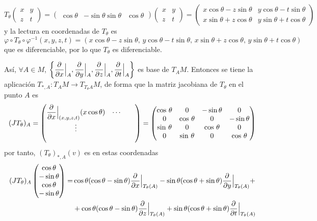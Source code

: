 \begin{sol}
    $$T_{\theta} \begin{pmatrix}
        x & y \\ z & t 
    \end{pmatrix} =  \begin{pmatrix}
        \cos  \theta  & -\sin \theta \sin\theta & \cos  \theta  
    \end{pmatrix} \begin{pmatrix}
        x & y \\ z & t 
    \end{pmatrix} =  \begin{pmatrix}
        x \cos  \theta-z \sin\theta & y \cos  \theta-t \sin\theta \\ x \sin\theta + z  \cos  \theta & y \sin\theta + t  \cos  \theta 
    \end{pmatrix} $$
    y la lectura en coordenadas de $T_{\theta}$ es $$\varphi \circ T_{\theta} \circ \varphi^{-1} (x,y,z,t) = (x \cos  \theta-z \sin\theta , \, y \cos  \theta-t \sin\theta,  \, x \sin\theta + z  \cos  \theta, \,  y \sin\theta + t  \cos  \theta )$$
    que es diferenciable, por lo que $T_{\theta}$ es diferenciable.

    As\'i, $\forall A \in M$, $\left\{\dfrac{\partial^{} }{\partial x} \Big|_A, \dfrac{\partial^{} }{\partial y} \Big|_A, \dfrac{\partial^{} }{\partial z} \Big|_A, \dfrac{\partial^{} }{\partial t} \Big|_A \right\}$ es base de $T_AM$. Entonces se tiene la aplicaci\'on $T_{*,A}: T_AM \longrightarrow T_{T_{\theta}A} M$, de forma que la matriz jacobiana de $T_{\theta}$ en el punto $A$ es 
    $$(JT_{\theta})_A = \begin{pmatrix}
        \dfrac{\partial^{} }{\partial x} \Big|_{(x,y,z,t)} (x  \cos  \theta ) &  \cdots & & \\
        \vdots \\ \\ 
    \end{pmatrix} = \begin{pmatrix}
         \cos  \,  \theta  & 0 & -\sin \theta & 0\\ 
        0 &  \cos  \, \theta & 0 & -\sin \theta \\
       \sin \, \theta & 0 &  \cos  \, \theta & 0 \\ 
        0 &\sin \, \theta & 0 &  \cos  \, \theta
    \end{pmatrix}$$
    por tanto, $(T_{\theta})_{*,A}(v)$ es en estas coordenadas
    \[\begin{split} (JT_{\theta})_A \begin{pmatrix}
         \cos  \theta \\ -\sin \theta \\  \cos  \theta \\ -\sin \theta  
    \end{pmatrix}= &   \cos  \theta ( \cos  \theta -\sin  \theta ) \dfrac{\partial^{} }{\partial x}  \Big|_{T_{\theta}(A)} -\sin \theta ( \cos  \theta+ \sin  \theta ) \dfrac{\partial^{} }{\partial y}  \Big|_{T_{\theta}(A)}+ \\ &  +  \cos  \theta ( \cos  \theta -\sin  \theta ) \dfrac{\partial^{} }{\partial z}  \Big|_{T_{\theta}(A)} +\sin \theta ( \cos  \theta +\sin  \theta ) \dfrac{\partial^{} }{\partial t}  \Big|_{T_{\theta}(A)}\end{split}\]
\end{sol}
